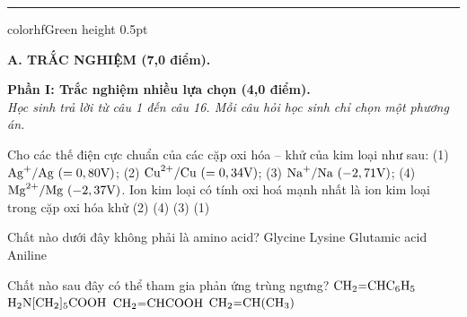 \documentclass[11pt,a4paper]{article}
\begin{document}
\vspace{4pt}
\hrule color{hfGreen} height 0.5pt

\vspace{4pt}
\noindent
{\color{mainGreen}\textbf{\Large A. TRẮC NGHIỆM (7,0 điểm).}}

\vspace{3pt}
\noindent
{\color{mainGreen}\textbf{\large Phần I: Trắc nghiệm nhiều lựa chọn (4,0 điểm).}}\\
\textit{\small Học sinh trả lời từ câu 1 đến câu 16. Mỗi câu hỏi học sinh chỉ chọn một phương án.}
\vspace{2pt}

\begin{ex}
Cho các thế điện cực chuẩn của các cặp oxi hóa -- khử của kim loại như sau:
(1) $\ce{Ag+}/\ce{Ag}\ (= 0,80\text{V})$; (2) $\ce{Cu^2+}/\ce{Cu}\ (= 0,34\text{V})$; (3) $\ce{Na+}/\ce{Na}\ (-2,71\text{V})$; (4) $\ce{Mg^2+}/\ce{Mg}\ (-2,37\text{V})$.
Ion kim loại có tính oxi hoá mạnh nhất là ion kim loại trong cặp oxi hóa khử
\choice
{(2)}
{(4)}
{(3)}
{\True (1)}

\end{ex}
\begin{ex}
Chất nào dưới đây không phải là amino acid?
\choice
{Glycine}
{Lysine}
{Glutamic acid}
{\True Aniline}

\end{ex}
\begin{ex}
Chất nào sau đây có thể tham gia phản ứng trùng ngưng?
\choice
{$\ce{CH2=CHC6H5}$}
{\True $\ce{H2N[CH2]5COOH}$}
{$\ce{CH2=CHCOOH}$}
{$\ce{CH2=CH(CH3)}$}

\end{ex}
\end{document}
